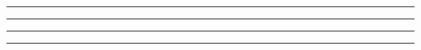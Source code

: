 \begin{problem}{4.5}

\end{problem}
\begin{solution}

\end{solution}

\noindent\rule{7in}{1.5pt}


\begin{problem}{4.6}

\end{problem}
\begin{solution}

\end{solution}

\noindent\rule{7in}{1.5pt}


\begin{problem}{4.7}

\end{problem}
\begin{solution}

\end{solution}

\noindent\rule{7in}{1.5pt}


\begin{problem}{4.8}

\end{problem}
\begin{solution}

\end{solution}

\noindent\rule{7in}{1.5pt}


\begin{problem}{4.9}

\end{problem}
\begin{solution}

\end{solution}

